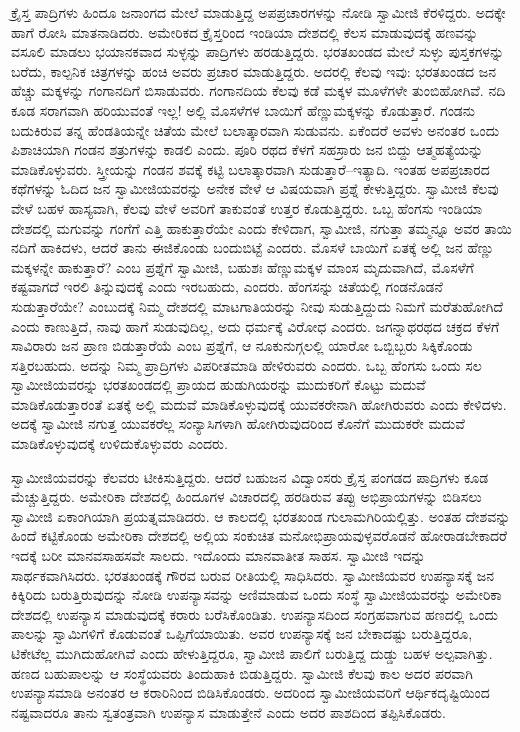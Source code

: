  ಕ್ರೈಸ್ತ ಪಾದ್ರಿಗಳು ಹಿಂದೂ ಜನಾಂಗದ ಮೇಲೆ ಮಾಡುತ್ತಿದ್ದ ಅಪಪ್ರಚಾರಗಳನ್ನು ನೋಡಿ ಸ್ವಾಮೀಜಿ ಕೆರಳಿದ್ದರು. ಅದಕ್ಕೇ ಹಾಗೆ ರೋಸಿ ಮಾತನಾಡಿದರು. ಅಮೇರಿಕದ ಕ್ರೈಸ್ತರಿಂದ ಇಂಡಿಯಾ ದೇಶದಲ್ಲಿ ಕೆಲಸ ಮಾಡುವುದಕ್ಕೆ ಹಣವನ್ನು ವಸೂಲಿ ಮಾಡಲು ಭಯಾನಕವಾದ ಸುಳ್ಳನ್ನು ಪಾದ್ರಿಗಳು ಹರಡುತ್ತಿದ್ದರು. ಭರತಖಂಡದ ಮೇಲೆ ಸುಳ್ಳು ಪುಸ್ತಕಗಳನ್ನು ಬರೆದು, ಕಾಲ್ಪನಿಕ ಚಿತ್ರಗಳನ್ನು ಹಂಚಿ ಅವರು ಪ್ರಚಾರ ಮಾಡುತ್ತಿದ್ದರು. ಅದರಲ್ಲಿ ಕೆಲವು ಇವು: ಭರತಖಂಡದ ಜನ ಹೆಚ್ಚು ಮಕ್ಕಳನ್ನು ಗಂಗಾನದಿಗೆ ಬಿಸಾಡುವರು. ಗಂಗಾನದಿಯ ಕೆಲವು ಕಡೆ ಮಕ್ಕಳ ಮೂಳೆಗಳೇ ತುಂಬಿಹೋಗಿವೆ. ನದಿ ಕೂಡ ಸರಾಗವಾಗಿ ಹರಿಯುವಂತೆ ಇಲ್ಲ! ಅಲ್ಲಿ ಮೊಸಳೆಗಳ ಬಾಯಿಗೆ ಹೆಣ್ಣುಮಕ್ಕಳನ್ನು ಕೊಡುತ್ತಾರೆ. ಗಂಡನು ಬದುಕಿರುವ ತನ್ನ ಹೆಂಡತಿಯನ್ನೇ ಚಿತೆಯ ಮೇಲೆ ಬಲಾತ್ಕಾರವಾಗಿ ಸುಡುವನು. ಏಕೆಂದರೆ ಅವಳು ಅನಂತರ ಒಂದು ಪಿಶಾಚಿಯಾಗಿ ಗಂಡನ ಶತ್ರುಗಳನ್ನು ಕಾಡಲಿ ಎಂದು. ಪೂರಿ ರಥದ ಕೆಳಗೆ ಸಹಸ್ರಾರು ಜನ ಬಿದ್ದು ಆತ್ಮಹತ್ಯೆಯನ್ನು ಮಾಡಿಕೊಳ್ಳುವರು. ಸ್ತ್ರೀಯನ್ನು ಗಂಡನ ಶವಕ್ಕೆ ಕಟ್ಟಿ ಬಲಾತ್ಕಾರವಾಗಿ ಸುಡುತ್ತಾರೆ–ಇತ್ಯಾದಿ. ಇಂತಹ ಅಪಪ್ರಚಾರದ ಕಥೆಗಳನ್ನು ಓದಿದ ಜನ ಸ್ವಾಮೀಜಿಯವರನ್ನು ಅನೇಕ ವೇಳೆ ಆ ವಿಷಯವಾಗಿ ಪ್ರಶ್ನೆ ಕೇಳುತ್ತಿದ್ದರು. ಸ್ವಾಮೀಜಿ ಕೆಲವು ವೇಳೆ ಬಹಳ ಹಾಸ್ಯವಾಗಿ, ಕೆಲವು ವೇಳೆ ಅವರಿಗೆ ತಾಕುವಂತೆ ಉತ್ತರ ಕೊಡುತ್ತಿದ್ದರು. ಒಬ್ಬ ಹೆಂಗಸು ಇಂಡಿಯಾ ದೇಶದಲ್ಲಿ ಮಗುವನ್ನು ಗಂಗೆಗೆ ಎತ್ತಿ ಹಾಕುತ್ತಾರೆಯೇ ಎಂದು ಕೇಳಿದಾಗ, ಸ್ವಾಮೀಜಿ, ನಗುತ್ತಾ ತಮ್ಮನ್ನೂ ಅವರ ತಾಯಿ ನದಿಗೆ ಹಾಕಿದಳು, ಆದರೆ ತಾನು ಈಜಿಕೊಂಡು ಬಂದುಬಿಟ್ಟೆ ಎಂದರು. ಮೊಸಳೆ ಬಾಯಿಗೆ ಏತಕ್ಕೆ ಅಲ್ಲಿ ಜನ ಹೆಣ್ಣು ಮಕ್ಕಳನ್ನೇ ಹಾಕುತ್ತಾರೆ? ಎಂಬ ಪ್ರಶ್ನೆಗೆ ಸ್ವಾಮೀಜಿ, ಬಹುಶಃ ಹೆಣ್ಣುಮಕ್ಕಳ ಮಾಂಸ ಮೃದುವಾಗಿದೆ, ಮೊಸಳೆಗೆ ಕಷ್ಟವಾಗದೆ ಇರಲಿ ತಿನ್ನುವುದಕ್ಕೆ ಎಂದು ಇರಬಹುದು, ಎಂದರು. ಹೆಂಗಸನ್ನು ಚಿತೆಯಲ್ಲಿ ಗಂಡನೊಡನೆ ಸುಡುತ್ತಾರೆಯೇ? ಎಂಬುದಕ್ಕೆ ನಿಮ್ಮ ದೇಶದಲ್ಲಿ ಮಾಟಗಾತಿಯರನ್ನು ನೀವು ಸುಡುತ್ತಿದ್ದುದು ನಿಮಗೆ ಮರೆತುಹೋಗಿದೆ ಎಂದು ಕಾಣುತ್ತಿದೆ, ನಾವು ಹಾಗೆ ಸುಡುವುದಿಲ್ಲ, ಅದು ಧರ್ಮಕ್ಕೆ ವಿರೋಧ ಎಂದರು. ಜಗನ್ನಾಥರಥದ ಚಕ್ರದ ಕೆಳಗೆ ಸಾವಿರಾರು ಜನ ಪ್ರಾಣ ಬಿಡುತ್ತಾರೆಯೆ ಎಂಬ ಪ್ರಶ್ನೆಗೆ, ಆ ನೂಕುನುಗ್ಗಲಲ್ಲಿ ಯಾರೋ ಒಬ್ಬಿಬ್ಬರು ಸಿಕ್ಕಿಕೊಂಡು ಸತ್ತಿರಬಹುದು. ಅದನ್ನು ನಿಮ್ಮ ಪ್ರಾದ್ರಿಗಳು ವಿಪರೀತಮಾಡಿ ಹೇಳಿರುವರು ಎಂದರು. ಒಬ್ಬ ಹೆಂಗಸು ಒಂದು ಸಲ ಸ್ವಾಮೀಜಿಯವರನ್ನು ಭರತಖಂಡದಲ್ಲಿ ಪ್ರಾಯದ ಹುಡುಗಿಯರನ್ನು ಮುದುಕರಿಗೆ ಕೊಟ್ಟು ಮದುವೆ ಮಾಡಿಕೊಡುತ್ತಾರಂತೆ ಏತಕ್ಕೆ ಅಲ್ಲಿ ಮದುವೆ ಮಾಡಿಕೊಳ್ಳುವುದಕ್ಕೆ ಯುವಕರೇನಾಗಿ ಹೋಗಿರುವರು ಎಂದು ಕೇಳಿದಳು. ಅದಕ್ಕೆ ಸ್ವಾಮೀಜಿ ನಗುತ್ತ ಯುವಕರೆಲ್ಲ ಸಂನ್ಯಾಸಿಗಳಾಗಿ ಹೋಗಿರುವುದರಿಂದ ಕೊನೆಗೆ ಮುದುಕರೇ ಮದುವೆ ಮಾಡಿಕೊಳ್ಳುವುದಕ್ಕೆ ಉಳಿದುಕೊಳ್ಳುವರು ಎಂದರು. 

 ಸ್ವಾಮೀಜಿಯವರನ್ನು ಕೆಲವರು ಟೀಕಿಸುತ್ತಿದ್ದರು. ಆದರೆ ಬಹುಜನ ವಿದ್ವಾಂಸರು ಕ್ರೈಸ್ತ ಪಂಗಡದ ಪಾದ್ರಿಗಳು ಕೂಡ ಮೆಚ್ಚುತ್ತಿದ್ದರು. ಅಮೇರಿಕಾ ದೇಶದಲ್ಲಿ ಹಿಂದೂಗಳ ವಿಚಾರದಲ್ಲಿ ಹರಡಿರುವ ತಪ್ಪು ಅಭಿಪ್ರಾಯಗಳನ್ನು ಬಿಡಿಸಲು ಸ್ವಾಮೀಜಿ ಏಕಾಂಗಿಯಾಗಿ ಪ್ರಯತ್ನಮಾಡಿದರು. ಆ ಕಾಲದಲ್ಲಿ ಭರತಖಂಡ ಗುಲಾಮಗಿರಿಯಲ್ಲಿತ್ತು. ಅಂತಹ ದೇಶವನ್ನು ಹಿಂದೆ ಕಟ್ಟಿಕೊಂಡು ಅಮೇರಿಕಾ ದೇಶದಲ್ಲಿ ಅಲ್ಲಿಯ ಸಂಕುಚಿತ ಮನೋಭಿಪ್ರಾಯವುಳ್ಳವರೊಡನೆ ಹೋರಾಡಬೇಕಾದರೆ ಇದಕ್ಕೆ ಬರೀ ಮಾನವ\break ಸಾಹಸವೇ ಸಾಲದು. ಇದೊಂದು ಮಾನವಾತೀತ ಸಾಹಸ. ಸ್ವಾಮೀಜಿ ಇದನ್ನು ಸಾರ್ಥಕವಾಗಿಸಿದರು. ಭರತಖಂಡಕ್ಕೆ ಗೌರವ ಬರುವ ರೀತಿಯಲ್ಲಿ ಸಾಧಿಸಿದರು. ಸ್ವಾಮೀಜಿಯವರ ಉಪನ್ಯಾಸಕ್ಕೆ ಜನ ಕಿಕ್ಕಿರಿದು ಬರುತ್ತಿರುವುದನ್ನು ನೋಡಿ ಉಪನ್ಯಾಸವನ್ನು ಅಣಿಮಾಡುವ ಒಂದು ಸಂಸ್ಥೆ ಸ್ವಾಮೀಜಿಯವರನ್ನು ಅಮೇರಿಕಾ ದೇಶದಲ್ಲಿ ಉಪನ್ಯಾಸ ಮಾಡುವುದಕ್ಕೆ ಕರಾರು ಬರೆಸಿಕೊಂಡಿತು. ಉಪನ್ಯಾಸದಿಂದ ಸಂಗ್ರಹವಾಗುವ ಹಣದಲ್ಲಿ ಒಂದು ಪಾಲನ್ನು ಸ್ವಾಮಿಗಳಿಗೆ ಕೊಡುವಂತೆ ಒಪ್ಪಿಗೆಯಾಯಿತು. ಅವರ ಉಪನ್ಯಾಸಕ್ಕೆ ಜನ ಬೇಕಾದಷ್ಟು ಬರುತ್ತಿದ್ದರೂ, ಟಿಕೇಟೆಲ್ಲ ಮುಗಿದುಹೋಗಿವೆ ಎಂದು ಹೇಳುತ್ತಿದ್ದರೂ, ಸ್ವಾಮೀಜಿ ಪಾಲಿಗೆ ಬರುತ್ತಿದ್ದ ದುಡ್ಡು ಬಹಳ ಅಲ್ಪವಾಗಿತ್ತು. ಹಣದ ಬಹುಪಾಲನ್ನು ಆ ಸಂಸ್ಥೆಯವರು ತಿಂದುಹಾಕಿ ಬಿಡುತ್ತಿದ್ದರು. ಸ್ವಾಮೀಜಿ ಕೆಲವು ಕಾಲ ಅದರ ಪರವಾಗಿ ಉಪನ್ಯಾಸಮಾಡಿ ಅನಂತರ ಆ ಕರಾರಿನಿಂದ ಬಿಡಿಸಿಕೊಂಡರು. ಅದರಿಂದ ಸ್ವಾಮೀಜಿಯವರಿಗೆ ಆರ್ಥಿಕದೃಷ್ಟಿಯಿಂದ ನಷ್ಟವಾದರೂ ತಾನು ಸ್ವತಂತ್ರವಾಗಿ ಉಪನ್ಯಾಸ ಮಾಡುತ್ತೇನೆ ಎಂದು ಅದರ ಪಾಶದಿಂದ ತಪ್ಪಿಸಿಕೊಡರು. 

